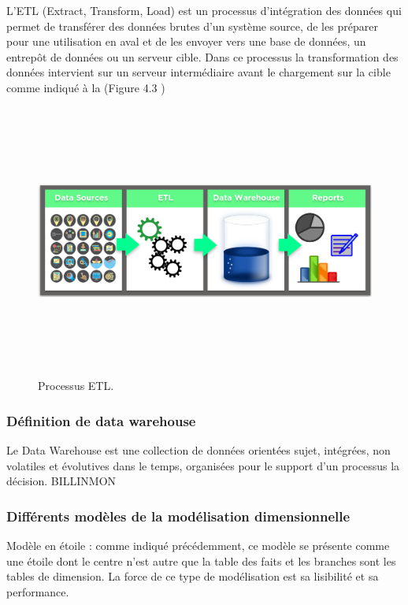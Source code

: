 L'ETL (Extract, Transform, Load) est un processus d'int\'{e}gration des donn\'{e}es qui permet de transf\'{e}rer des donn\'{e}es brutes d'un syst\`{e}me source, de les pr\'{e}parer pour une utilisation en aval et de les envoyer vers une base de donn\'{e}es, un entrep\^{o}t de donn\'{e}es ou un serveur cible. Dans ce processus la transformation des donn\'{e}es intervient sur un serveur interm\'{e}diaire avant le chargement sur la cible comme indiqué
\`{a} la (Figure 4.3 )
\begin{figure}[H]
\center
\includegraphics[width=14cm,height=9cm]{./figures/bi1.png}
\caption{Processus ETL.}
\end{figure}


\subsubsection{D\'{e}finition de data warehouse}
\guillemotleft{}Le Data Warehouse est une collection de donn\'{e}es orient\'{e}es sujet,
int\'{e}gr\'{e}es, non volatiles et \'{e}volutives dans le temps, organis\'{e}es pour le
support d'un processus la d\'{e}cision.\guillemotright{} BILLINMON


\subsubsection{Diff\'{e}rents mod\`{e}les de la mod\'{e}lisation dimensionnelle}
 Mod\`{e}le en \'{e}toile : comme indiqu\'{e} pr\'{e}c\'{e}demment, ce mod\`{e}le se pr\'{e}sente comme
une \'{e}toile dont le centre n'est autre que la table des faits et les branches sont les tables
de dimension. La force de ce type de mod\'{e}lisation est sa lisibilit\'{e} et sa performance.




